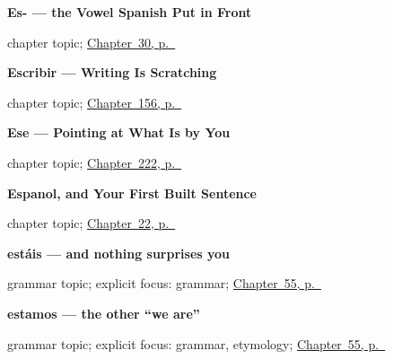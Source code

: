 \noindent\begin{minipage}[t]{\linewidth}
\raggedright
\textbf{Es- --- the Vowel Spanish Put in Front}\par
\footnotesize chapter topic; \hyperref[ch:es-inicial]{Chapter~30, p.~\pageref*{ch:es-inicial}}
\end{minipage}\par\smallskip

\noindent\begin{minipage}[t]{\linewidth}
\raggedright
\textbf{Escribir — Writing Is Scratching}\par
\footnotesize chapter topic; \hyperref[ch:spanish-escribir]{Chapter~156, p.~\pageref*{ch:spanish-escribir}}
\end{minipage}\par\smallskip

\noindent\begin{minipage}[t]{\linewidth}
\raggedright
\textbf{Ese --- Pointing at What Is by You}\par
\footnotesize chapter topic; \hyperref[ch:ese]{Chapter~222, p.~\pageref*{ch:ese}}
\end{minipage}\par\smallskip

\noindent\begin{minipage}[t]{\linewidth}
\raggedright
\textbf{Espanol, and Your First Built Sentence}\par
\footnotesize chapter topic; \hyperref[ch:spanish-espanol]{Chapter~22, p.~\pageref*{ch:spanish-espanol}}
\end{minipage}\par\smallskip

\noindent\begin{minipage}[t]{\linewidth}
\raggedright
\textbf{estáis — and nothing surprises you}\par
\footnotesize grammar topic; explicit focus: grammar; \hyperref[ch:spanish-estar-plural]{Chapter~55, p.~\pageref*{ch:spanish-estar-plural}}
\end{minipage}\par\smallskip

\noindent\begin{minipage}[t]{\linewidth}
\raggedright
\textbf{estamos — the other \textquotedblleft{}we are\textquotedblright{}}\par
\footnotesize grammar topic; explicit focus: grammar, etymology; \hyperref[ch:spanish-estar-plural]{Chapter~55, p.~\pageref*{ch:spanish-estar-plural}}
\end{minipage}\par\smallskip


